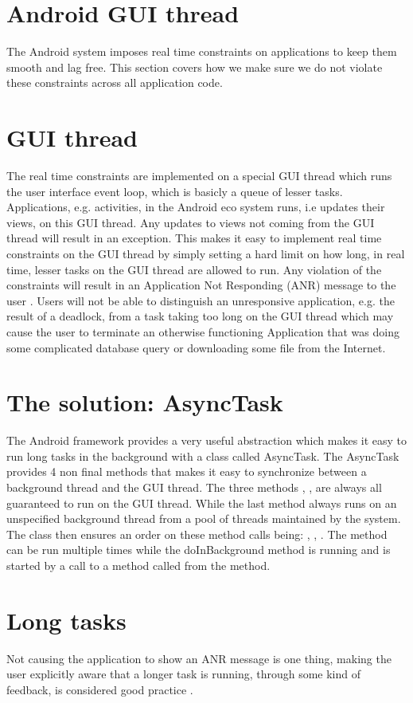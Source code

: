 
\section{Android GUI thread}
\label{sec:gui_thread_async_task}

The Android system imposes real time constraints on applications to keep them smooth and lag free. This section covers how we make sure we do not violate these constraints across all application code.

\section{GUI thread}
The real time constraints are implemented on a special GUI thread which runs the user interface event loop, which is basicly a queue of lesser tasks. Applications, e.g. activities, in the Android eco system runs, i.e updates their views, on this GUI thread. Any updates to views not coming from the GUI thread will result in an exception. This makes it easy to implement real time constraints on the GUI thread by simply setting a hard limit on how long, in real time, lesser tasks on the GUI thread are allowed to run. Any violation of the constraints will result in an Application Not Responding (ANR) message to the user \parencite{android_avoid_anr}. Users will not be able to distinguish an unresponsive application, e.g. the result of a deadlock, from a task taking too long on the GUI thread which may cause the user to terminate an otherwise functioning Application that was doing some complicated database query or downloading some file from the Internet. 

\section{The solution: AsyncTask}

The Android framework provides a very useful abstraction which makes it easy to run long tasks in the background with a class called AsyncTask. The AsyncTask provides 4 non final methods that makes it easy to synchronize between a background thread and the GUI thread. The three methods , ,  are always all guaranteed to run on the GUI thread. While the last method  always runs on an unspecified background thread from a pool of threads maintained by the system. The class then ensures an order on these method calls being: , , . The  method can be run multiple times while the doInBackground method is running and is started by a call to a method called  from the  method.  

\section{Long tasks}

Not causing the application to show an ANR message is one thing, making the user explicitly aware that a longer task is running, through some kind of feedback, is considered good practice \parencite{benyon}.